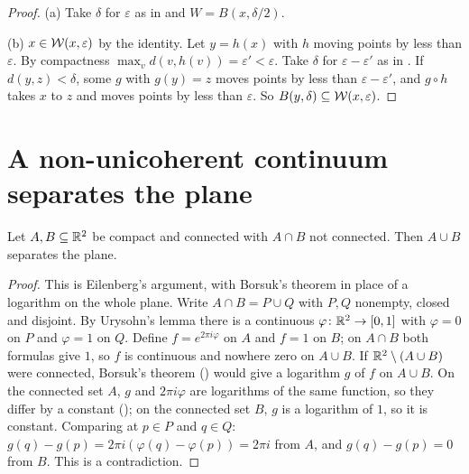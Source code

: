 \begin{proof}
(a) Take $\delta$ for $\varepsilon$ as in  and $W=B(x,\delta/2)$.

(b) $x\in\mathcal{W}(x,\varepsilon)$ by the identity. Let $y=h(x)$ with $h$ moving points by less than $\varepsilon$.
By compactness $\max_v d(v,h(v))=\varepsilon'<\varepsilon$. Take $\delta$ for $\varepsilon-\varepsilon'$ as in
. If $d(y,z)<\delta$, some $g$ with $g(y)=z$ moves points by less than
$\varepsilon-\varepsilon'$, and $g\circ h$ takes $x$ to $z$ and moves points by less than $\varepsilon$. So
$B(y,\delta)\subseteq\mathcal{W}(x,\varepsilon)$.
\end{proof}


\section{A non-unicoherent continuum separates the plane}

\begin{proposition}\label{prop:moore22}
Let $A,B\subseteq\mathbb{R}^2$ be compact and connected with $A\cap B$ not connected. Then $A\cup B$ separates the
plane.
\end{proposition}

\begin{proof}
This is Eilenberg's argument, with Borsuk's theorem in place of a logarithm on the whole plane. Write
$A\cap B=P\cup Q$ with $P,Q$ nonempty, closed and disjoint. By Urysohn's lemma there is a continuous
$\varphi\colon\mathbb{R}^2\to[0,1]$ with $\varphi=0$ on $P$ and $\varphi=1$ on $Q$. Define $f=e^{2\pi i\varphi}$ on $A$ and
$f=1$ on $B$; on $A\cap B$ both formulas give $1$, so $f$ is continuous and nowhere zero on $A\cup B$. If
$\mathbb{R}^2\setminus(A\cup B)$ were connected, Borsuk's theorem () would give a logarithm $g$
of $f$ on $A\cup B$. On the connected set $A$, $g$ and $2\pi i\varphi$ are logarithms of the same function,
so they differ by a constant (); on the connected set $B$, $g$ is a logarithm of $1$,
so it is constant. Comparing at $p\in P$ and $q\in Q$: $g(q)-g(p)=2\pi i(\varphi(q)-\varphi(p))=2\pi i$ from
$A$, and $g(q)-g(p)=0$ from $B$. This is a contradiction.
\end{proof}


